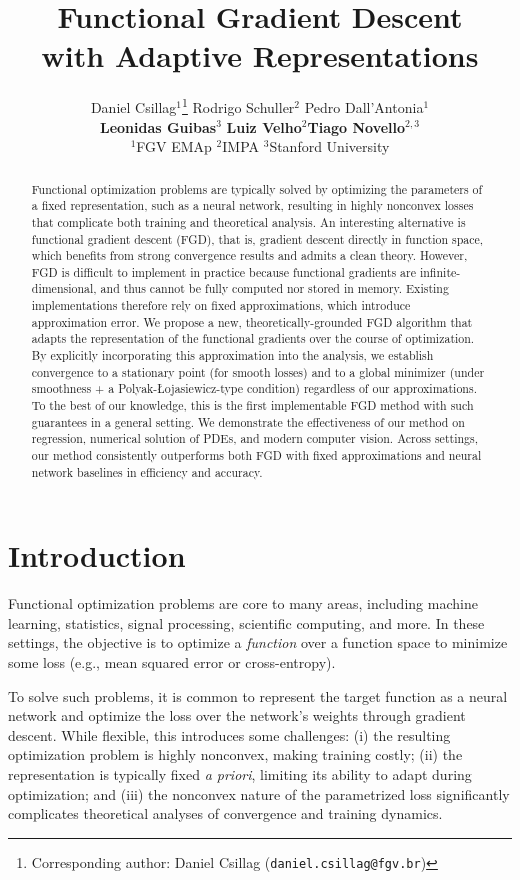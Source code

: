\documentclass{article}
\title{
    Functional Gradient Descent \\ with Adaptive Representations
}
\author{%
   Daniel Csillag$^{1}$\thanks{Corresponding author: Daniel Csillag (\texttt{daniel.csillag@fgv.br})} \quad Rodrigo Schuller$^2$ \quad Pedro Dall'Antonia$^1$ \\[0.2cm]
   \textbf{Leonidas Guibas}$^3$ \quad \textbf{Luiz Velho}$^{2}$\quad \textbf{Tiago Novello}$^{2,3}$ \\[0.2cm]
   $^{1}${\small FGV EMAp} \quad $^{2}${\small IMPA} \quad $^{3}${\small Stanford University} %
}
\begin{document}
\maketitle


\begin{abstract}
    Functional optimization problems are typically solved by optimizing the parameters of a fixed representation, such as a neural network,
    resulting in highly nonconvex losses that complicate both training and theoretical analysis.
    An interesting alternative is functional gradient descent (FGD), that is, gradient descent directly in function space, which benefits from strong convergence results and admits a clean theory.
    However, FGD is difficult to implement in practice because functional gradients are infinite-dimensional, and thus cannot be fully computed nor stored in memory.
    Existing implementations therefore rely on fixed approximations, which introduce approximation error.
    We propose a new, theoretically-grounded FGD algorithm that adapts the representation of the functional gradients over the course of optimization.
    By explicitly incorporating this approximation into the analysis, we establish convergence to a stationary point (for smooth losses) and to a global minimizer (under smoothness + a Polyak-Łojasiewicz-type condition) regardless of our approximations.
    To the best of our knowledge, this is the first implementable FGD method with such guarantees in a general setting.
    We demonstrate the effectiveness of our method on regression, numerical solution of PDEs, and modern computer vision. Across settings, our method consistently outperforms both FGD with fixed approximations and neural network baselines in efficiency and accuracy.
\end{abstract}

\section{Introduction}

Functional optimization problems are core to many areas, including machine learning, statistics, signal processing, scientific computing, and more.
In these settings, the objective is to optimize a \emph{function} over a function space to minimize some loss (e.g., mean squared error or cross-entropy).

To solve such problems, it is common to represent the target function as a neural network and optimize the loss over the network's weights through gradient descent.
While flexible, this introduces some challenges:
(i) the resulting optimization problem is highly nonconvex, making training costly;
(ii) the representation is typically fixed \textit{a priori}, limiting its ability to adapt during optimization; and
(iii) the nonconvex nature of the parametrized loss significantly complicates theoretical analyses of convergence and training dynamics.
\end{document}
